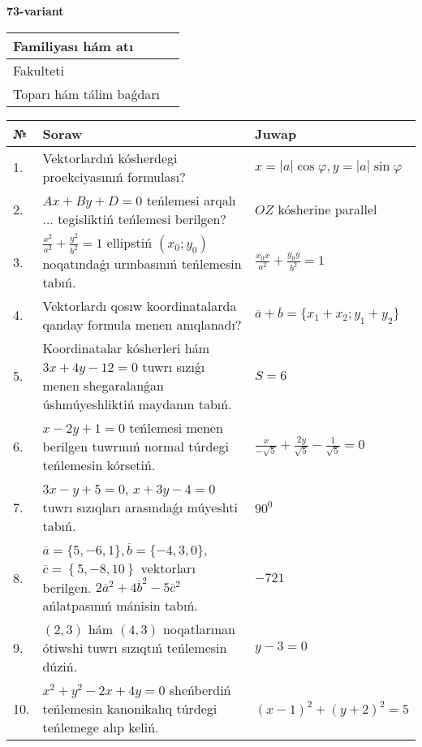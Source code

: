 \documentclass{article}
\begin{document}
\egroup

\newpage


\textbf{73-variant}\\

\bgroup
\def\arraystretch{1.6} %

\begin{tabular}{|m{5.7cm}|m{9.5cm}|}
\hline
Familiyası hám atı & \\
\hline
Fakulteti  & \\
\hline
Toparı hám tálim baǵdarı  & \\
\hline
\end{tabular}

\vspace{1cm}

\begin{tabular}{|m{0.7cm}|m{10cm}|m{4cm}|}
\hline
№ & Soraw & Juwap \\
\hline
1. & Vektorlardıń kósherdegi proekciyasınıń formulası? & $x=|a|\cos\varphi, y=|a|\sin\varphi$ \\
\hline
2. & $Ax+By+D=0$ teńlemesi arqalı ... tegisliktiń teńlemesi berilgen? & $OZ$ kósherine parallel \\
\hline
3. & $\frac{x^2}{a^2}+\frac{y^2}{b^2}=1$ ellipstiń $(x_0;y_0)$ noqatındaǵı urınbasınıń teńlemesin tabıń. & $\frac{x_0x}{a^2}+\frac{y_0y}{b^2}=1$ \\
\hline
4. & Vektorlardı qosıw koordinatalarda qanday formula menen anıqlanadı? & $\overline{a}+\overline{b}=\{x_1+x_2;y_1+y_2\}$ \\
\hline
5. & Koordinatalar kósherleri hám $ 3x+4y-12=0 $ tuwrı sızıǵı menen shegaralanǵan úshmúyeshliktiń maydanın tabıń. & $ S=6 $ \\
\hline
6. & $x-2y+1=0$ teńlemesi menen berilgen tuwrınıń normal túrdegi teńlemesin kórsetiń. & $\frac{x}{- \sqrt{5}}+\frac{2y}{\sqrt{5}}-\frac{1}{\sqrt{5}}=0$ \\
\hline
7. & $3x-y+5=0$, $x+3y-4=0$ tuwrı sızıqları arasındaǵı múyeshti tabıń. & $90^{0}$ \\
\hline
8. & $\overline{a}=\{5,-6, 1 \}, \overline{b}=\{-4, 3, 0 \} $, $\overline{c}=\left\{ 5,-8, 10 \right\}$ vektorları berilgen. $2{\overline{a}}^{2}+4{\overline{b}}^{2}-5{\overline{c}}^{2}$ ańlatpasınıń mánisin tabıń. & $-721$ \\
\hline
9. & $(2, 3)$ hám $(4, 3)$ noqatlarınan ótiwshi tuwrı sızıqtıń teńlemesin dúziń. & $ y-3=0$ \\
\hline
10. & $x^{2}+y^{2}-2x+4y=0$ sheńberdiń teńlemesin kanonikalıq túrdegi teńlemege alıp keliń. & $(x-1)^{2}+(y+2)^{2}=5$ \\
\hline
\end{tabular}
\end{document}
